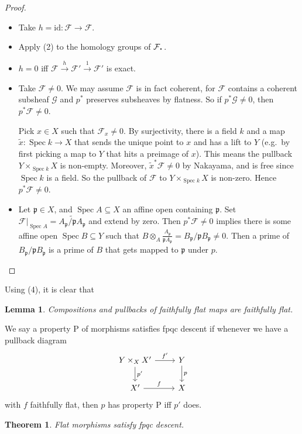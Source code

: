 \documentclass{shortart}
\newtheorem*{thm}{Theorem}
\newtheorem*{lemma}{Lemma}
\theoremstyle{definition}
\DeclareMathOperator\Spec{Spec}
\newcommand*{\Cdot}{{\raisebox{-0.25ex}{\scalebox{1.5}{$\cdot$}}}}
\begin{document}
\begin{proof}\leavevmode
  \begin{itemize}[leftmargin=2cm]
    \item [(1) $\Rightarrow$ (2)] Take $h = \mathrm{id}: \mathcal{F} \to \mathcal{F}$.
    \item [(2) $\Rightarrow$ (3)] Apply (2) to the homology groups of $\mathcal{F}_\Cdot$.
    \item [(3) $\Rightarrow$ (1)] $h = 0$ iff $\mathcal{F} \overset{h}{\to} \mathcal{F}' \overset{1}{\to} \mathcal{F}'$ is exact.
    \item [(4) $\Rightarrow$ (2)] Take $\mathcal{F} \not= 0$. We may assume $\mathcal{F}$ is in fact coherent, for $\mathcal{F}$ contains a coherent subsheaf $\mathcal{G}$ and $p^*$ preserves subsheaves by flatness. So if $p^* \mathcal{G} \not= 0$, then $p^* \mathcal{F} \not= 0$.
    
      Pick $x \in X$ such that $\mathcal{F}_x \not= 0$. By surjectivity, there is a field $k$ and a map $\tilde{x}: \Spec k \to X$ that sends the unique point to $x$ and has a lift to $Y$ (e.g.\ by first picking a map to $Y$ that hits a preimage of $x$). This means the pullback $Y \times_{\Spec k} X$ is non-empty. Moreover, $\tilde{x}^* \mathcal{F} \not= 0$ by Nakayama, and is free since $\Spec k$ is a field. So the pullback of $\mathcal{F}$ to $Y \times_{\Spec k} X$ is non-zero. Hence $p^* \mathcal{F} \not= 0$.

    \item [(2) $\Rightarrow$ (4)] Let $\mathfrak{p} \in X$, and $\Spec A \subseteq X$ an affine open containing $\mathfrak{p}$. Set $\mathcal{F}|_{\Spec A} = \widetilde{A_\mathfrak{p}/\mathfrak{p} A_\mathfrak{p}}$ and extend by zero. Then $p^* \mathcal{F} \not= 0$ implies there is some affine open $\Spec B \subseteq Y$ such that $B \otimes_A \frac{A_\mathfrak{p}}{\mathfrak{p}A_\mathfrak{p}} =B_\mathfrak{p}/\mathfrak{p}B_\mathfrak{p} \not= 0$. Then a prime of $B_\mathfrak{p}/\mathfrak{p}B_\mathfrak{p}$ is a prime of $B$ that gets mapped to $\mathfrak{p}$ under $p$.\qedhere
  \end{itemize}
\end{proof}
Using (4), it is clear that
\begin{lemma}
  Compositions and pullbacks of faithfully flat maps are faithfully flat.
\end{lemma}

We say a property P of morphisms satisfies fpqc descent if whenever we have a pullback diagram
\[
  \begin{tikzcd}
    Y \times_X X' \ar[d, "p'"] \ar[r, "f'"] & Y \ar[d, "p"]\\
    X' \ar[r, "f"] & X
  \end{tikzcd}
\]
with $f$ faithfully flat, then $p$ has property P iff $p'$ does.
\begin{thm}
  Flat morphisms satisfy fpqc descent.
\end{thm}
\end{document}
